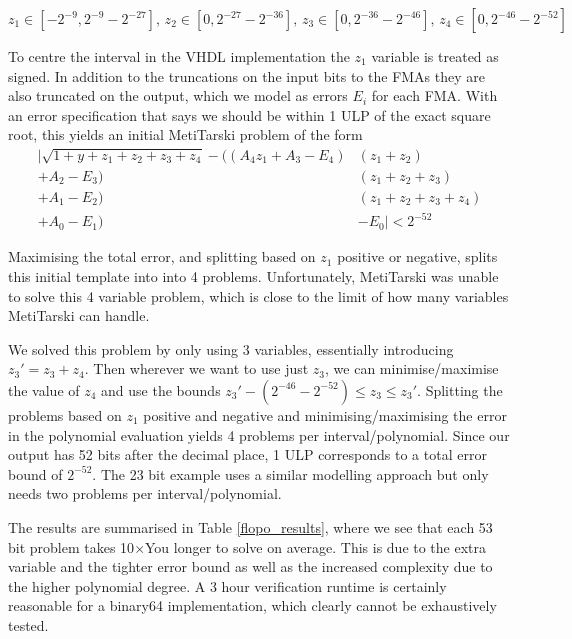 \documentclass{fac}
\begin{document}
\begin{equation*}
    z_1 \in [-2^{-9}, 2^{-9}-2^{-27}], \,
    z_2 \in [0, 2^{-27} - 2^{-36}],\,
    z_3 \in [0, 2^{-36} - 2^{-46}],\,
    z_4 \in [0, 2^{-46} - 2^{-52}]
\end{equation*}

To centre the interval in the VHDL implementation the $z_1$ variable is treated as signed. In addition to the truncations on the input bits to the FMAs they are also truncated on the output, which we model as errors $E_i$ for each FMA\@. With an error specification that says we should be within 1 ULP of the exact square root, this yields an initial MetiTarski problem of the form
\begin{align*}
    |\sqrt{1+y+z_1+z_2+z_3+z_4} - ((A_4  z_1 + A_3 - E_4) & (z_1+z_2)\\
                                  + A_2 - E_3) & (z_1+z_2+z_3)\\
                                  + A_1 - E_2) & (z_1+z_2+z_3+z_4)\\
                                  + A_0 - E_1) &- E_0 | < 2^{-52}
\end{align*}

Maximising the total error, and splitting based on $z_1$ positive or negative, splits this initial template into into 4 problems.
Unfortunately, MetiTarski was unable to solve this 4 variable problem, which is close to the limit of how many variables MetiTarski can handle. 

We solved this problem by only using 3 variables, essentially introducing $z_3' = z_3+z_4$. Then wherever we want to use just $z_3$, we can minimise/maximise the value of $z_4$ and use the bounds $z_3' - (2^{-46} - 2^{-52}) \leq z_3 \leq z_3'$. Splitting the problems based on $z_1$ positive and negative and minimising/maximising the error in the polynomial evaluation yields 4 problems per interval/polynomial. Since our output has 52 bits after the decimal place, 1 ULP corresponds to a total error bound of $2^{-52}$. The 23 bit example uses a similar modelling approach but only needs two problems per interval/polynomial. 

The results are summarised in Table \ref{flopo_results}, where we see that each 53 bit problem takes 10$\times$You longer to solve on average. This is due to the extra variable and the tighter error bound as well as the increased complexity due to the higher polynomial degree. A 3 hour verification runtime is certainly reasonable for a binary64 implementation, which clearly cannot be exhaustively tested.
\end{document}
